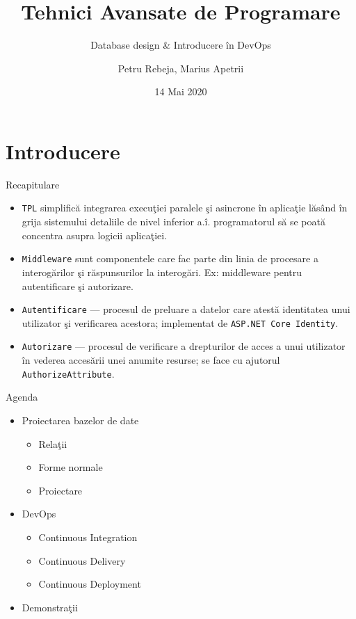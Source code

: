 \documentclass[presentation]{beamer}
\author{Petru Rebeja, Marius Apetrii}
\date{14 Mai 2020}
\title{Tehnici Avansate de Programare}
\subtitle{Database design \& Introducere în DevOps}
\institute[UAIC]{Facultatea de Matematică\\Universitatea Alexandru Ioan Cuza, Iași}
\begin{document}
\maketitle
\section{Introducere}
\label{sec:org4507d23}
\begin{frame}[label={sec:orgfa5e7a6},fragile]{Recapitulare}
 \pause
\begin{itemize}
\item \texttt{TPL} simplifică integrarea execuţiei paralele şi asincrone în aplicaţie lăsând în grija sistemului detaliile de nivel inferior a.î. programatorul să se poată concentra asupra logicii aplicaţiei.
\end{itemize}
\pause
\begin{itemize}
\item \texttt{Middleware} sunt componentele care fac parte din linia de procesare a interogărilor şi răspunsurilor la interogări. Ex: middleware pentru autentificare şi autorizare.
\end{itemize}
\pause
\begin{itemize}
\item \texttt{Autentificare} --- procesul de preluare a datelor care atestă identitatea unui utilizator şi verificarea acestora; implementat de \texttt{ASP.NET Core Identity}.
\end{itemize}
\pause
\begin{itemize}
\item \texttt{Autorizare} --- procesul de verificare a drepturilor de acces a  unui utilizator în vederea accesării unei anumite resurse; se face cu ajutorul \texttt{AuthorizeAttribute}.
\end{itemize}
\end{frame}
\begin{frame}[label={sec:org648bfb8}]{Agenda}
\begin{itemize}
\item Proiectarea bazelor de date
\begin{itemize}
\item Relaţii
\item Forme normale
\item Proiectare
\end{itemize}
\item DevOps
\begin{itemize}
\item Continuous Integration
\item Continuous Delivery
\item Continuous Deployment
\end{itemize}
\item Demonstraţii
\end{itemize}
\end{frame}
\end{document}
